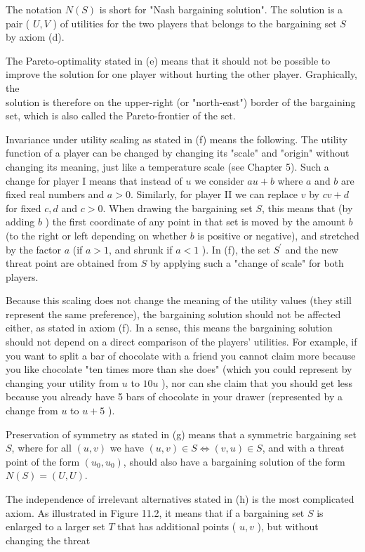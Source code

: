 \documentclass[12pt]{article}
\begin{document}
The notation $N(S)$ is short for "Nash bargaining solution". The solution is a pair ( $U, V$ ) of utilities for the two players that belongs to the bargaining set $S$ by axiom (d).

The Pareto-optimality stated in (e) means that it should not be possible to improve the solution for one player without hurting the other player. Graphically, the\\
solution is therefore on the upper-right (or "north-east") border of the bargaining set, which is also called the Pareto-frontier of the set.

Invariance under utility scaling as stated in (f) means the following. The utility function of a player can be changed by changing its "scale" and "origin" without changing its meaning, just like a temperature scale (see Chapter 5). Such a change for player I means that instead of $u$ we consider $a u+b$ where $a$ and $b$ are fixed real numbers and $a>0$. Similarly, for player II we can replace $v$ by $c v+d$ for fixed $c, d$ and $c>0$. When drawing the bargaining set $S$, this means that (by adding $b$ ) the first coordinate of any point in that set is moved by the amount $b$ (to the right or left depending on whether $b$ is positive or negative), and stretched by the factor $a$ (if $a>1$, and shrunk if $a<1$ ). In (f), the set $S^{\prime}$ and the new threat point are obtained from $S$ by applying such a "change of scale" for both players.

Because this scaling does not change the meaning of the utility values (they still represent the same preference), the bargaining solution should not be affected either, as stated in axiom (f). In a sense, this means the bargaining solution should not depend on a direct comparison of the players' utilities. For example, if you want to split a bar of chocolate with a friend you cannot claim more because you like chocolate "ten times more than she does" (which you could represent by changing your utility from $u$ to $10 u$ ), nor can she claim that you should get less because you already have 5 bars of chocolate in your drawer (represented by a change from $u$ to $u+5$ ).

Preservation of symmetry as stated in (g) means that a symmetric bargaining set $S$, where for all $(u, v)$ we have $(u, v) \in S \Leftrightarrow(v, u) \in S$, and with a threat point of the form $\left(u_{0}, u_{0}\right)$, should also have a bargaining solution of the form $N(S)=(U, U)$.

The independence of irrelevant alternatives stated in (h) is the most complicated axiom. As illustrated in Figure 11.2, it means that if a bargaining set $S$ is enlarged to a larger set $T$ that has additional points ( $u, v$ ), but without changing the threat
\end{document}
